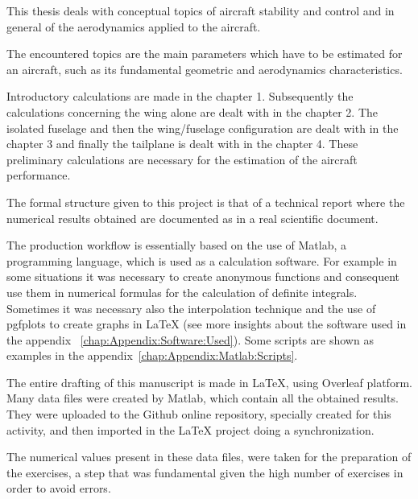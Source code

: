 \thispagestyle{empty}

This thesis deals with conceptual topics of aircraft stability and control and in general of the aerodynamics applied to the aircraft.

The encountered topics are the main parameters which have to be estimated for an aircraft, such as its fundamental geometric and aerodynamics characteristics.

Introductory calculations are made in the chapter 1. Subsequently the calculations concerning the wing alone are dealt with in the chapter 2. The isolated fuselage and then the wing/fuselage configuration are dealt with in the chapter 3 and finally the tailplane is dealt with in the chapter 4. These preliminary calculations are necessary for the estimation of the aircraft performance.

The formal structure given to this project is that of a technical report where the numerical results obtained are documented as in a real scientific document.  

The production workflow is essentially based on the use of Matlab, a programming language, which is used as a calculation software. For example in some situations it was necessary to create anonymous functions and consequent use them in numerical formulas for the calculation of definite integrals. Sometimes it was necessary also the interpolation technique and the use of pgfplots to create graphs in \LaTeX{} (see more insights about the software used in the appendix ~\ref{chap:Appendix:Software:Used}).  Some scripts are shown as examples in the appendix~\ref{chap:Appendix:Matlab:Scripts}. 

The entire drafting of this manuscript is made in \LaTeX{}, using Overleaf platform. 
Many data files were created by Matlab, which contain all the obtained results. They were uploaded to the Github online repository, specially created for this activity, and then imported in the \LaTeX{} project doing a synchronization.

The numerical values present in these data files, were taken for the preparation of the exercises, a step that was fundamental given the high number of exercises in order to avoid errors.
